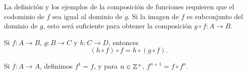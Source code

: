 \newpage

\begin{importante}
    La definición y los ejemplos de la composición de funciones requieren que el codominio de $f$ sea igual al dominio de $g$. Si la imagen de $f$ es subconjunto del dominio de $g$, esto será suficiente para obtener la composición $g \circ f:A \longrightarrow B$.
\end{importante}

\begin{theorem}{}{}
    Si $f:A \longrightarrow B$, $g:B \longrightarrow C$ y $h: C \longrightarrow D$, entonces
    $$(h \circ f) \circ f = h \circ (g \circ f).$$
\end{theorem}

\begin{definicion}{}{}
    Si $f:A \longrightarrow A$, definimos $f^1 = f$, y para $n \in \ZZ[+]$, $f^{n+1} = f \circ f^n$.
\end{definicion}

